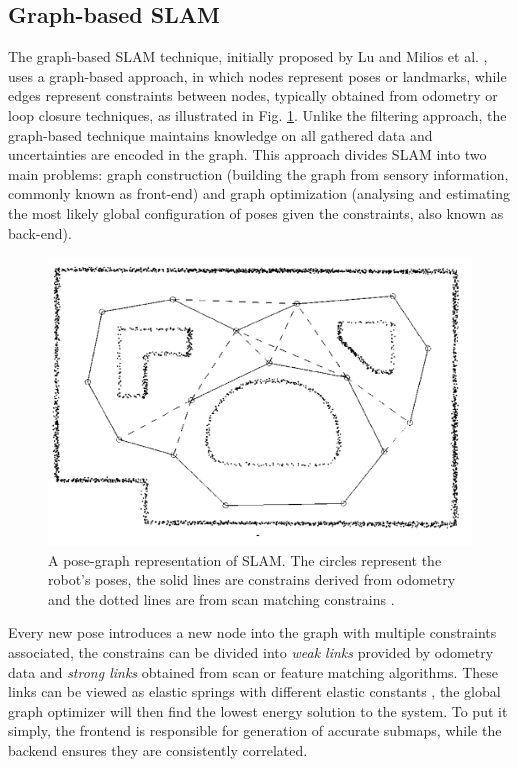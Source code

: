 \subsection{Graph-based \acs*{SLAM}}

The graph-based \acs*{SLAM} technique, initially proposed by Lu and Milios et al. \cite{lu_globally_1997}, uses a graph-based approach, in which nodes represent poses or landmarks, while edges represent constraints between nodes, typically obtained from odometry or loop closure techniques, as illustrated in Fig. \ref*{fig: graph SLAM}. Unlike the filtering approach, the graph-based technique maintains knowledge on all gathered data and uncertainties are encoded in the graph. This approach divides \acs*{SLAM} into two main problems: graph construction (building the graph from sensory information, commonly known as front-end) and graph optimization (analysing and estimating the most likely global configuration of poses given the constraints, also known as back-end).

\begin{figure}[H]
    \centering
    \includegraphics[width=0.7\linewidth]{images/background/graph_SLAM.png}
    \caption{A pose-graph representation of \acs*{SLAM}. The circles represent the robot's poses, the solid lines are constrains derived from odometry and the dotted lines are from scan matching constrains \cite{lu_globally_1997}.}
    \label{fig: graph SLAM}
\end{figure}

Every new pose introduces a new node into the graph with multiple constraints associated, the constrains can be divided into \textit{weak links} provided by odometry data and \textit{strong links} obtained from scan or feature matching algorithms. These links can be viewed as elastic springs with different elastic constants \cite{lu_globally_1997}, the global graph optimizer will then find the lowest energy solution to the system. To put it simply, the frontend is responsible for generation of accurate submaps, while the backend ensures they are consistently correlated.

